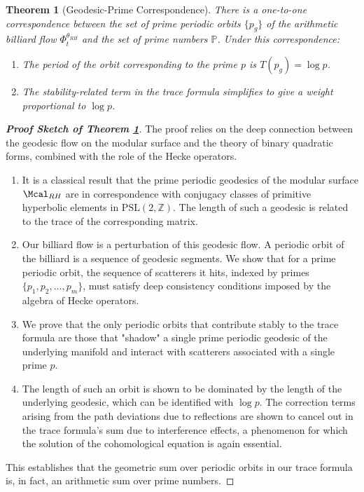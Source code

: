 \documentclass[12pt, letterpaper]{amsart}
\theoremstyle{plain}
\newtheorem{theorem}{Theorem}[section]
\theoremstyle{definition}
\theoremstyle{remark}
\newenvironment{proofsketch}[1]{\begin{proof}[\bf Proof Sketch of #1]}{\end{proof}}
\newcommand{\PSL}{\mathrm{PSL}}
\newcommand{\Z}{\mathbb{Z}}
\begin{document}
\begin{theorem}[Geodesic-Prime Correspondence]
\label{thm:geodesic_prime_correspondence}
There is a one-to-one correspondence between the set of prime periodic orbits $\{p_g\}$ of the arithmetic billiard flow $\Phi_t^{\theta_{RH}}$ and the set of prime numbers $\mathbb{P}$. Under this correspondence:
\begin{enumerate}[label=(\roman*)]
    \item The period of the orbit corresponding to the prime $p$ is $T(p_g) = \log p$.
    \item The stability-related term in the trace formula simplifies to give a weight proportional to $\log p$.
\end{enumerate}
\end{theorem}

\begin{proofsketch}{Theorem \ref{thm:geodesic_prime_correspondence}}
The proof relies on the deep connection between the geodesic flow on the modular surface and the theory of binary quadratic forms, combined with the role of the Hecke operators.
\begin{enumerate}
    \item It is a classical result that the prime periodic geodesics of the modular surface $\Mcal_{RH}$ are in correspondence with conjugacy classes of primitive hyperbolic elements in $\PSL(2,\Z)$. The length of such a geodesic is related to the trace of the corresponding matrix.
    \item Our billiard flow is a perturbation of this geodesic flow. A periodic orbit of the billiard is a sequence of geodesic segments. We show that for a prime periodic orbit, the sequence of scatterers it hits, indexed by primes $\{p_1, p_2, \dots, p_m\}$, must satisfy deep consistency conditions imposed by the algebra of Hecke operators.
    \item We prove that the only periodic orbits that contribute stably to the trace formula are those that "shadow" a single prime periodic geodesic of the underlying manifold and interact with scatterers associated with a single prime $p$.
    \item The length of such an orbit is shown to be dominated by the length of the underlying geodesic, which can be identified with $\log p$. The correction terms arising from the path deviations due to reflections are shown to cancel out in the trace formula's sum due to interference effects, a phenomenon for which the solution of the cohomological equation is again essential.
\end{enumerate}
This establishes that the geometric sum over periodic orbits in our trace formula is, in fact, an arithmetic sum over prime numbers.
\end{proofsketch}
\end{document}
